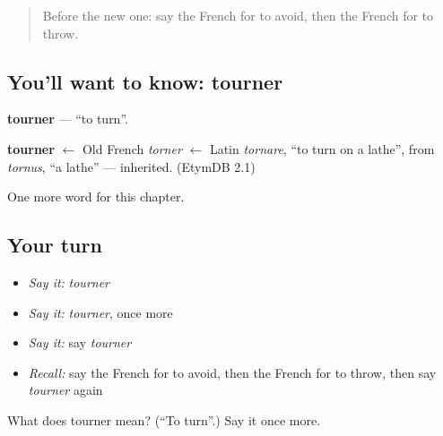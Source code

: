 \begin{quote}
Before the new one: say the French for to avoid, then the French for to throw.
\end{quote}

\subsection*{You'll want to know: tourner}
\textbf{tourner} — \textquotedblleft{}to turn\textquotedblright{}.

\begin{cousinweb}
\textbf{tourner} $\leftarrow$ Old French \emph{torner} $\leftarrow$ Latin \emph{tornare}, \textquotedblleft{}to turn on a lathe\textquotedblright{}, from \emph{tornus}, \textquotedblleft{}a lathe\textquotedblright{} — inherited. (EtymDB 2.1)
\end{cousinweb}

\begin{grammarlens}[title={What you've built}]
One more word for this chapter.
\end{grammarlens}

\subsection*{Your turn}
\begin{itemize}
\raggedright
  \item \emph{Say it:} \emph{tourner}
  \item \emph{Say it:} \emph{tourner}, once more
  \item \emph{Say it:} say \emph{tourner}
  \item \emph{Recall:} say the French for to avoid, then the French for to throw, then say \emph{tourner} again
\end{itemize}

\begin{tcolorbox}[breakable,colback=teal!4,colframe=teal!35!black,title={Before you move on}]
What does tourner mean? (\textquotedblleft{}To turn\textquotedblright{}.) Say it once more.
\end{tcolorbox}
